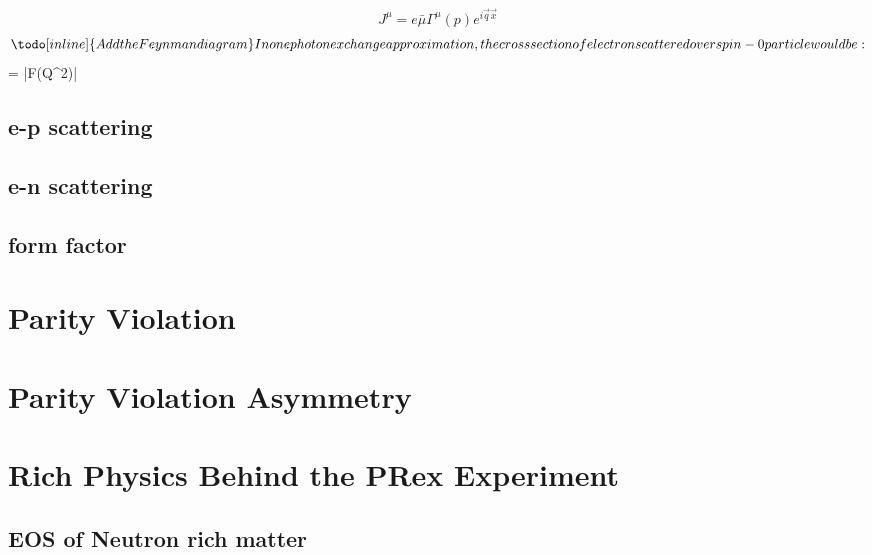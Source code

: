 $$
J^\mu = e\bar{\mu}\Gamma^\mu(p)e^{i\vec{q}\vec{x}}$$
$$

\todo[inline]{Add the Feynman diagram}

In one photon exchange approximation, the cross section of electron scattered over spin-0 particle would be:

$$
 = |F(Q^2)|
$$


\subsection{e-p scattering}
\subsection{e-n scattering}
\subsection{form factor}


\section{Parity Violation}
\section{Parity Violation Asymmetry}
\section{Rich Physics Behind the PRex Experiment}
\subsection{EOS of Neutron rich matter}